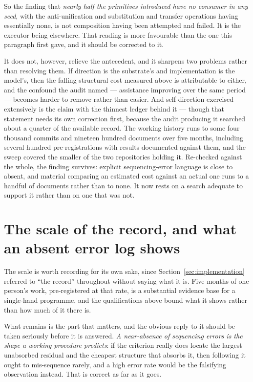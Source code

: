\documentclass[11pt,a4paper]{article}
\theoremstyle{remark}\newtheorem{remark}[definition]{Remark}
\begin{document}
So the finding that \emph{nearly half the primitives introduced have no consumer in any seed}, with the
anti-unification and substitution and transfer operations having essentially none, is not composition
having been attempted and failed. It is the executor being elsewhere. That reading is more favourable
than the one this paragraph first gave, and it should be corrected to it.

It does not, however, relieve the antecedent, and it sharpens two problems rather than resolving them.
If direction is the substrate's and implementation is the model's, then the falling structural cost
measured above is attributable to either, and the confound the audit named --- assistance improving over
the same period --- becomes harder to remove rather than easier. And self-direction exercised
extensively is the claim with the thinnest ledger behind it --- though that statement needs its own
correction first, because the audit producing it searched about a quarter of the available record. The
working history runs to some four thousand commits and nineteen hundred documents over five months,
including several hundred pre-registrations with results documented against them, and the sweep covered
the smaller of the two repositories holding it. Re-checked against the whole, the finding survives:
explicit sequencing-error language is close to absent, and material comparing an estimated cost against
an actual one runs to a handful of documents rather than to none. It now rests on a search adequate to
support it rather than on one that was not.

\section{The scale of the record, and what an absent error log shows}\label{sec:scale}

The scale is worth recording for its own sake, since Section~\ref{sec:implementation} referred to ``the record''
throughout without saying what it is. Five months of one person's work, pre-registered at that rate, is
a substantial evidence base for a single-hand programme, and the qualifications above bound what it
shows rather than how much of it there is.

What remains is the part that matters, and the obvious reply to it should be taken seriously before it
is answered. \emph{A near-absence of sequencing errors is the shape a working procedure predicts}: if
the criterion really does locate the largest unabsorbed residual and the cheapest structure that
absorbs it, then following it ought to mis-sequence rarely, and a high error rate would be the
falsifying observation instead. That is correct as far as it goes.
\end{document}
